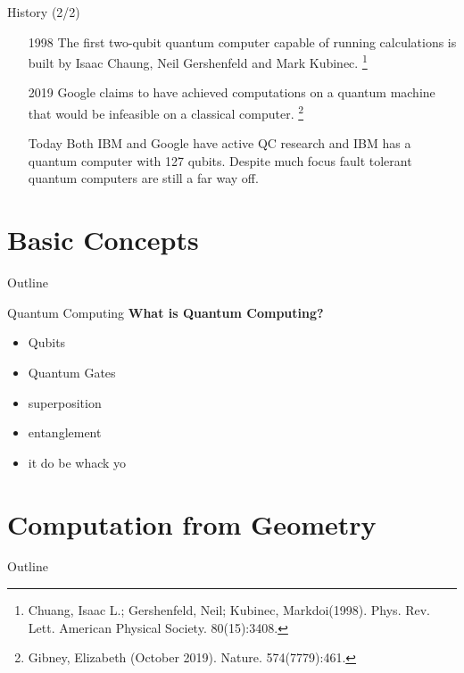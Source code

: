 \documentclass[t]{beamer}
\begin{document}
\begin{frame}{History (2/2)}
\begin{itemize}
\item[1998] The first two-qubit quantum computer capable of running calculations is built by Isaac Chaung, Neil Gershenfeld and Mark Kubinec. 
\footnote{\scriptsize Chuang, Isaac L.; Gershenfeld, Neil; Kubinec, Markdoi(1998). Phys. Rev. Lett. American Physical Society. 80(15):3408.}

\item[2019] Google claims to have achieved computations on a quantum machine that would be infeasible on a classical computer.  
\footnote{\scriptsize Gibney, Elizabeth (October 2019). Nature. 574(7779):461.}


\item[Today] Both IBM and Google have active QC research and IBM has a quantum computer with 127 qubits. Despite much focus fault tolerant quantum computers are still a far way off.


\end{itemize}
\end{frame}

\section{Basic Concepts}
\begin{frame}{Outline}
\tableofcontents[ 
currentsubsection, 
hideothersubsections, 
sectionstyle=show/shaded, 
subsectionstyle=show/shaded, 
] 
\end{frame}
\begin{frame}{Quantum Computing}
\textbf{What is Quantum Computing?}


\begin{itemize}
\item Qubits
\item Quantum Gates
\item superposition
\item entanglement 
\item it do be whack yo
\end{itemize}

\end{frame}

\section{Computation from Geometry}

\begin{frame}{Outline}
\tableofcontents[ 
currentsubsection, 
hideothersubsections, 
sectionstyle=show/shaded, 
subsectionstyle=show/shaded, 
] 
\end{frame}
\end{document}

